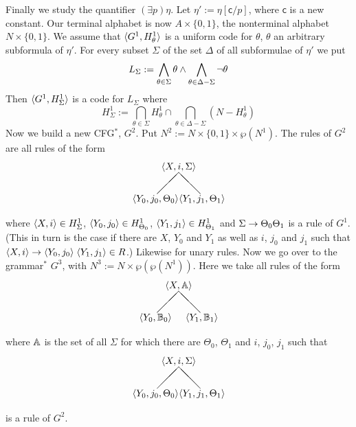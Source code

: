 Finally we study the quantifier $(\exists p)\eta$.
Let $\eta' := \eta[\mathsf{c}/p]$, where $\mathsf{c}$ is a new constant.
Our terminal alphabet is now $A \times \{0,1\}$, the
nonterminal alphabet $N \times \{0,1\}$.  We assume that
$\langle G^1, H^1_{\theta}\rangle$ is a uniform code for $\theta$, $\theta$
an arbitrary subformula of $\eta'$. For every subset $\Sigma$ of
the set $\Delta$ of all subformulae of $\eta'$ we put
\begin{equation}
L_{\Sigma} := \bigwedge_{\theta \in \Sigma} \theta \wedge
    \bigwedge_{\theta \in \Delta - \Sigma} \neg\theta
\end{equation}
Then $\langle G^1, H^1_{\Sigma}\rangle$ is a code for $L_{\Sigma}$
where
\begin{equation}
H^1_{\Sigma} := \bigcap_{\theta \in \Sigma} H^1_{\theta} \cap
    \bigcap_{\theta \in \Delta - \Sigma} (N - H^1_{\theta})
\end{equation}
Now we build a new CFG$^{\ast}$, $G^2$. Put $N^2 := N \times
\{0,1\} \times \wp(N^1)$. The rules of $G^2$ are
all rules of the form
\begin{equation}
\begin{array}{l}
\binbaum{\auf X, i, \Sigma\zu}{\auf Y_0, j_0, \Theta_0\zu}%
{\auf Y_1, j_1, \Theta_1\zu}
\end{array}
\end{equation}
where $\langle X,i\rangle \in H^1_{\Sigma}$, $\auf Y_0, j_0\zu \in %
H^1_{\Theta_0}$,  $\langle Y_1, j_1\rangle \in H^1_{\Theta_1}$ and
$\Sigma \rightarrow \Theta_0\Theta_1$ is a rule of $G^1$. (This in turn
is the case if there are $X$, $Y_0$ and $Y_1$ as well as $i$, $j_0$
and $j_1$ such that $\langle X,i\rangle \rightarrow \langle Y_0, j_0\rangle\;
\langle Y_1,j_1\rangle \in R$.) Likewise for unary rules. Now
we go over to the grammar$^{\ast}$ $G^3$, with $N^3 := N \times
\wp(\wp(N^1))$. Here we take all rules of the form
\begin{equation}
\begin{array}{l}
\binbaum{\auf X, \BA\zu}{\auf Y_0, \BB_0\zu}{\auf Y_1,\BB_1\zu}
\end{array}
\end{equation}
where $\mathbb{A}$ is the set of all $\Sigma$ for which there are
$\Theta_0$, $\Theta_1$ and $i$, $j_0$, $j_1$ such that
\begin{equation}
\begin{array}{l}
\binbaum{\auf X, i, \Sigma\zu}{\auf Y_0, j_0, \Theta_0\zu}%
{\auf Y_1, j_1, \Theta_1\zu}
\end{array}
\end{equation}
is a rule of $G^2$.
